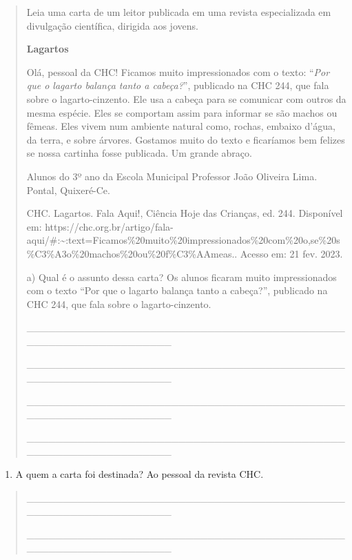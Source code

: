 \begin{quote}
Leia uma carta de um leitor publicada em uma revista especializada em
divulgação científica, dirigida aos jovens.

\textbf{Lagartos}

Olá, pessoal da CHC! \protect\hypertarget{_Hlk127887653}{}{}Ficamos
muito impressionados com o texto: ``\emph{Por que o lagarto balança
tanto a cabeça?}'', publicado na CHC 244, que fala sobre o
lagarto-cinzento. Ele usa a cabeça para se comunicar com outros da mesma
espécie. Eles se comportam assim para informar se são machos ou fêmeas.
Eles vivem num ambiente natural como, rochas, embaixo d'água, da terra,
e sobre árvores. Gostamos muito do texto e ficaríamos bem felizes se
nossa cartinha fosse publicada. Um grande abraço.

Alunos do 3º ano da Escola Municipal Professor João Oliveira Lima.
Pontal, Quixeré-Ce.

CHC. Lagartos. Fala Aqui!, Ciência Hoje das Crianças, ed. 244.
Disponível em:
https://chc.org.br/artigo/fala-aqui/\#:\textasciitilde{}:text=Ficamos\%20muito\%20impressionados\%20com\%20o,se\%20s\%C3\%A3o\%20machos\%20ou\%20f\%C3\%AAmeas..
Acesso em: 21 fev. 2023.

a) Qual é o assunto dessa carta? Os alunos ficaram muito impressionados
com o texto ``Por que o lagarto balança tanto a cabeça?'', publicado na
CHC 244, que fala sobre o lagarto-cinzento.

\protect\hypertarget{_Hlk127887290}{}{}\_\_\_\_\_\_\_\_\_\_\_\_\_\_\_\_\_\_\_\_\_\_\_\_\_\_\_\_\_\_\_\_\_\_\_\_\_\_\_\_\_\_\_\_\_\_\_\_\_\_\_\_\_\_\_\_\_\_\_\_\_\_\_\_

\_\_\_\_\_\_\_\_\_\_\_\_\_\_\_\_\_\_\_\_\_\_\_\_\_\_\_\_\_\_\_\_\_\_\_\_\_\_\_\_\_\_\_\_\_\_\_\_\_\_\_\_\_\_\_\_\_\_\_\_\_\_\_\_

\_\_\_\_\_\_\_\_\_\_\_\_\_\_\_\_\_\_\_\_\_\_\_\_\_\_\_\_\_\_\_\_\_\_\_\_\_\_\_\_\_\_\_\_\_\_\_\_\_\_\_\_\_\_\_\_\_\_\_\_\_\_\_\_

\_\_\_\_\_\_\_\_\_\_\_\_\_\_\_\_\_\_\_\_\_\_\_\_\_\_\_\_\_\_\_\_\_\_\_\_\_\_\_\_\_\_\_\_\_\_\_\_\_\_\_\_\_\_\_\_\_\_\_\_\_\_\_\_
\end{quote}

\begin{enumerate}
\def\labelenumi{\alph{enumi})}
\item
  A quem a carta foi destinada? Ao pessoal da revista CHC.
\end{enumerate}

\begin{quote}
\_\_\_\_\_\_\_\_\_\_\_\_\_\_\_\_\_\_\_\_\_\_\_\_\_\_\_\_\_\_\_\_\_\_\_\_\_\_\_\_\_\_\_\_\_\_\_\_\_\_\_\_\_\_\_\_\_\_\_\_\_\_\_\_

\_\_\_\_\_\_\_\_\_\_\_\_\_\_\_\_\_\_\_\_\_\_\_\_\_\_\_\_\_\_\_\_\_\_\_\_\_\_\_\_\_\_\_\_\_\_\_\_\_\_\_\_\_\_\_\_\_\_\_\_\_\_\_\_
\end{quote}

